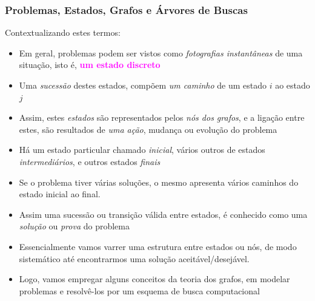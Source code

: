 \begin{frame}[fragile,  allowframebreaks=0.8]
\frametitle{Problemas, Estados, Grafos e  Árvores de Buscas}

Contextualizando estes termos:

\begin{itemize}

  \item Em geral, problemas podem ser vistos como \textit{fotografias 
  instantâneas} de uma situação, isto é, \textcolor{magenta}{\textbf{um estado discreto}}
   
  \item Uma \textit{sucessão} destes estados, compõem \textit{um caminho} de um estado $i$ ao estado $j$
  
  \item Assim, estes \textit{estados} são representados pelos \textit{nós dos grafos}, e a ligação entre 
  estes, são resultados de \textit{uma ação}, mudança ou evolução do problema
  
  \item Há um estado particular chamado \textit{inicial},  vários outros de estados \textit{intermediários},
   e outros estados \textit{finais}
  
  \item Se o problema tiver várias soluções,  o mesmo apresenta vários caminhos do estado inicial ao  final.
  
  \item Assim uma sucessão ou transição válida entre estados, é conhecido como uma \textit{solução} ou \textit{prova}
     do problema

  \item Essencialmente vamos varrer uma estrutura
     entre estados ou nós, de modo sistemático até encontrarmos
     uma solução aceitável/desejável.

    \item Logo, vamos empregar alguns conceitos da teoria dos grafos, em modelar problemas e resolvê-los 
  por um esquema de busca computacional
  
    
\end{itemize}

\end{frame}



